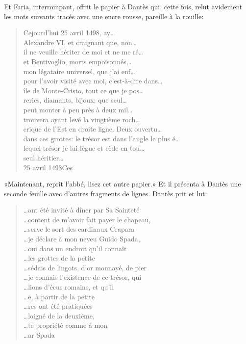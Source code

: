 Et Faria, interrompant, offrit le papier à Dantès qui, cette fois, relut avidement les mots suivants tracés avec une encre rousse, pareille à la rouille:
\goodbreak
\begin{quotation}\raggedright\oldfont

\noindent Cejourd'hui 25 avril 1498, ay\dots \\
Alexandre VI, et craignant que, non\dots \\
il ne veuille hériter de moi et ne me ré\dots \\
et Bentivoglio, morts empoisonnés,\dots \\
mon légataire universel, que j'ai enf\dots \\
pour l'avoir visité avec moi, c'est-à-dire dans\dots \\
île de Monte-Cristo, tout ce que je pos\dots \\
reries, diamants, bijoux; que seul\dots \\
peut monter à peu près à deux mil\dots \\
trouvera ayant levé la vingtième roch\dots \\
crique de l'Est en droite ligne. Deux ouvertu\dots \\
dans ces grottes: le trésor est dans l'angle le plus é\dots \\
lequel trésor je lui lègue et cède en tou\dots \\
seul héritier\dots \\
25 avril 1498\hspace{2em}Ces
\end{quotation}

\goodbreak
«Maintenant, reprit l'abbé, lisez cet autre papier.» Et il présenta à Dantès une seconde feuille avec d'autres fragments de lignes. Dantès prit et lut:

\goodbreak
\begin{quotation}\raggedleft\oldfont
 \dots ant été invité à dîner par Sa Sainteté\\
 \dots content de m'avoir fait payer le chapeau,\\
 \dots serve le sort des cardinaux Crapara\\
 \dots je déclare à mon neveu Guido Spada,\\
 \dots oui dans un endroit qu'il connaît\\
 \dots les grottes de la petite\\
 \dots sédais de lingots, d'or monnayé, de pier\\
 \dots je connais l'existence de ce trésor, qui\\
 \dots lions d'écus romains, et qu'il\\
 \dots e, à partir de la petite\\
 \dots res ont été pratiquées\\
 \dots loigné de la deuxième,\\
 \dots te propriété comme à mon\\
 \dots ar Spada
\end{quotation}
\goodbreak

